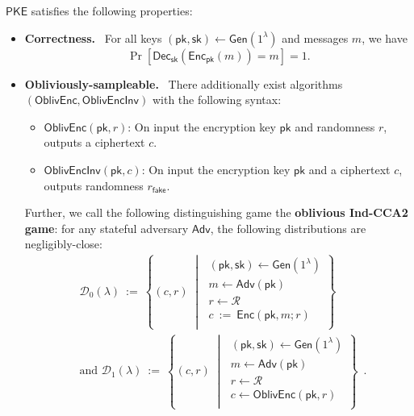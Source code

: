 \documentclass[11pt,letterpaper]{article}
\renewcommand{\emph}[1]{\textbf{#1}~}
\theoremstyle{plain} %
\theoremstyle{definition} %
\theoremstyle{remark} %
\newcommand{\eqdef}{\ {:=} \ }
\newcommand{\SecParam}{\lambda}
\newcommand{\PKE}{\mathsf{PKE}}
\newcommand{\Gen}{\mathsf{Gen}}
\newcommand{\Enc}{\mathsf{Enc}}
\newcommand{\OblivEnc}{\mathsf{OblivEnc}}
\newcommand{\OblivEncInv}{\mathsf{OblivEncInv}}
\newcommand{\Dec}{\mathsf{Dec}}
\newcommand{\EncKey}{\mathsf{pk}}
\newcommand{\DecKey}{\mathsf{sk}}
\newcommand{\Msg}{m}
\newcommand{\Ciphertext}{c}
\newcommand{\Rand}{r}
\newcommand{\FakeRand}{r_{\mathsf{fake}}}
\newcommand{\Distribution}{\mathcal{D}}
\newcommand{\RandSpace}{\mathcal{R}}
\newcommand{\Adversary}{{\mathsf{Adv}}} %
\newcommand{\pST}{\; \middle| \;}
\begin{document}
$\PKE$ satisfies the following properties:
\begin{itemize}
    \item \emph{Correctness.} For all keys $(\EncKey, \DecKey) \gets \Gen(1^{\SecParam})$ and messages $\Msg$, we have
    \[ \Pr[ \Dec_{\DecKey} (\Enc_{\EncKey} (\Msg)) = \Msg ] = 1. \]

    \item \emph{Obliviously-sampleable.} There additionally exist algorithms $(\OblivEnc, \OblivEncInv)$ with the following syntax:
    \begin{itemize}
    	\item $\OblivEnc(\EncKey,\Rand)$: On input the encryption key $\EncKey$ and randomness $\Rand$, outputs a ciphertext $\Ciphertext$.
    	\item $\OblivEncInv(\EncKey,\Ciphertext)$: On input the encryption key $\EncKey$ and a ciphertext $\Ciphertext$, outputs randomness $\FakeRand$.
    \end{itemize}

    Further, we call the following distinguishing game the \textbf{oblivious Ind-CCA2 game}: for any stateful adversary $\Adversary$, the following distributions are negligibly-close:
    \begin{align*}
		&\Distribution_0(\SecParam) \eqdef \left\{
		(\Ciphertext,\Rand)
		\pST
		\begin{array}{r}
            (\EncKey,\DecKey)\gets \Gen(1^\SecParam)\\
			\Msg \gets \Adversary(\EncKey)\\
            \Rand \gets \RandSpace\\
			\Ciphertext \eqdef \Enc(\EncKey,\Msg;\Rand)\\
		\end{array}
		\right\} \\
		&\text{and } \Distribution_1(\SecParam) \eqdef \left\{
		(\Ciphertext, \Rand)
		\pST
		\begin{array}{r}
            (\EncKey,\DecKey)\gets \Gen(1^\SecParam)\\
            \Msg \gets \Adversary(\EncKey)\\
            \Rand \gets \RandSpace\\
            \Ciphertext \gets \OblivEnc(\EncKey,\Rand)\\
		\end{array}
		\right\} \enspace.
	\end{align*}
\end{itemize}
\end{document}
